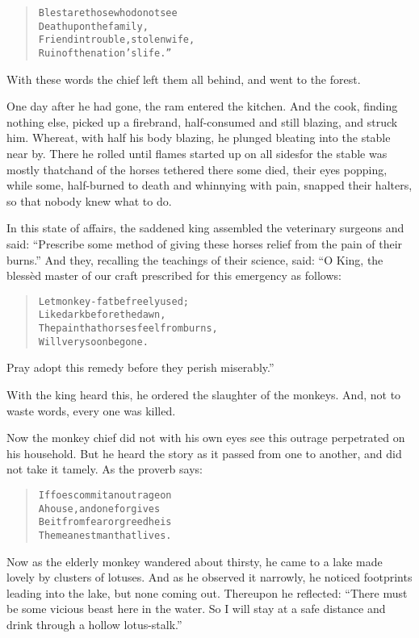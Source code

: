 \documentclass[article, twoside, 14pt]{memoir}
\renewenvironment{verbatim}{%
\begin{quote}%
\vskip -10pt%
\begin{alltt}\normalfont\large}{\end{alltt}%
\end{quote}%
\vskip -10pt
} %
\begin{document}
\begin{verbatim}
Blest are those who do not see
Death upon the family,
Friend in trouble, stolen wife,
Ruin of the nation's life.”
\end{verbatim}
With these words the chief left them all behind, and went to the
forest.

One day after he had gone, the ram entered the kitchen. And the
cook, finding nothing else, picked up a firebrand, half-consumed
and still blazing, and struck him. Whereat, with half his body
blazing, he plunged bleating into the stable near by. There
he rolled until flames started up on all sides{\textemdash}for the stable was
mostly thatch{\textemdash}and of the horses tethered there some died, their
eyes popping, while some, half-burned to death and whinnying with
pain, snapped their halters, so that nobody knew what to do.

In this state of affairs, the saddened king assembled the
veterinary surgeons and said:
``Prescribe some method of giving these horses relief from the pain of their burns.''
And they, recalling the teachings of their science, said: “O King,
the blessèd master of our craft prescribed for this emergency as
follows:

\begin{verbatim}
Let monkey-fat be freely used;
    Like dark before the dawn,
The pain that horses feel from burns,
    Will very soon be gone.
\end{verbatim}
Pray adopt this remedy before they perish miserably.”

With the king heard this, he ordered the slaughter of the monkeys.
And, not to waste words, every one was killed.

Now the monkey chief did not with his own eyes see this outrage
perpetrated on his household. But he heard the story as it passed
from one to another, and did not take it tamely. As the proverb
says:

\begin{verbatim}
If foes commit an outrage on
    A house, and one forgives{\textemdash}
Be it from fear or greed{\textemdash}he is
    The meanest man that lives.
\end{verbatim}
Now as the elderly monkey wandered about thirsty, he came to a lake
made lovely by clusters of lotuses. And as he observed it narrowly,
he noticed footprints leading into the lake, but none coming out.
Thereupon he reflected:
``There must be some vicious beast here in the water. So I will stay at a safe distance and drink through a hollow lotus-stalk.''
\end{document}
